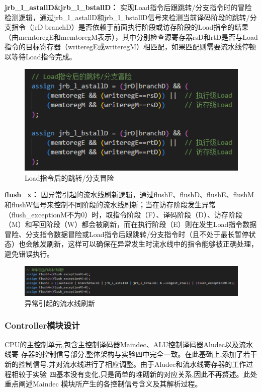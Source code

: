 \newpage
\textbf{jrb\_l\_astallD\&jrb\_l\_bstallD：}
实现Load指令后跟跳转/分支指令时的冒险检测逻辑，通过jrb\_l\_astallD和jrb\_l\_bstallD信号来检测当前译码阶段的跳转/分支指令（jrD|branchD）是否依赖于前面执行阶段或访存阶段的Load指令的结果（由memtoregE和memtoregM表示），其中分别检查源寄存器rsD和rtD是否与Load指令的目标寄存器（writeregE或writeregM）相匹配，如果匹配则需要流水线停顿以等待Load指令完成。
\begin{figure}[h]
\centering
\includegraphics[width=1\linewidth]{image/hazard7.png}
\caption{Load指令后的跳转/分支冒险}
\label{fig:enter-label}
\end{figure}

\textbf{flush\_x：}
因异常引起的流水线刷新逻辑，通过flushF、flushD、flushE、flushM和flushW信号来控制不同阶段的流水线刷新；当在访存阶段发生异常（flush\_exceptionM不为0）时，取指令阶段（F）、译码阶段（D）、访存阶段（M）和写回阶段（W）都会被刷新，而在执行阶段（E）则在发生Load指令数据冒险、分支指令数据冒险或Load指令后跟跳转/分支指令时（且不处于最长暂停状态）也会触发刷新，这样可以确保在异常发生时流水线中的指令能够被正确处理，避免错误执行。
\begin{figure}[h]
\centering
\includegraphics[width=1\linewidth]{image/hazard8.png}
\caption{异常引起的流水线刷新}
\label{fig:enter-label}
\end{figure}

\subsubsection{Controller模块设计}

CPU的主控制单元,包含主控制译码器Maindec、ALU控制译码器Aludec以及流水线寄 存器的控制信号部分,整体架构与实验四中完全一致。在此基础上,添加了若干新的控制信号,并对流水线进行了相应调整。由于Aludec和流水线寄存器的工作过程相较于实验 四基本没有变化,只是简单的堆砌新的对应关系,因此不再赘述。此处重点阐述Maindec 模块所产生的各控制信号含义及其解析过程。 


